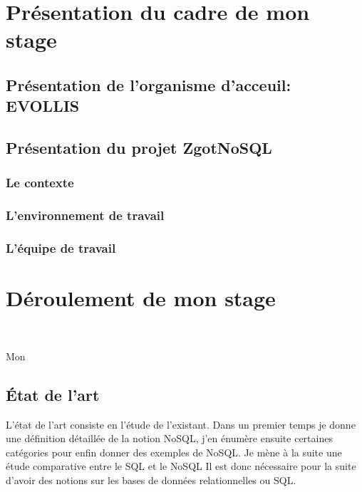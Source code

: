 




\begin{abstract}
  
\end{abstract}

\tableofcontents





\part{Présentation du cadre de mon stage}

\chapter{Présentation de l'organisme d'acceuil: {\sf EVOLLIS}}
\chapter{Présentation du projet {\sf ZgotNoSQL}}
\section{Le contexte}
\section{L'environnement de travail}
\section{L'équipe de travail}

\part{Déroulement de mon stage}

\newpage
~
\vspace{7cm}
\begin{center}
  \textsf{Mon} 
\end{center}
\newpage

\chapter{État de l'art}
L'état de l'art consiste en l'étude de l'existant. Dans un premier temps je donne une définition détaillée de la notion \textsf{NoSQL}, j'en énumère ensuite certaines catégories pour enfin donner des exemples de \textsf{NoSQL}. Je mène à la suite une étude comparative entre le \textsf{SQL} et le \textsf{NoSQL} Il est donc nécessaire pour la suite d'avoir des notions sur les bases de données relationnelles ou \textsf{SQL}. 


